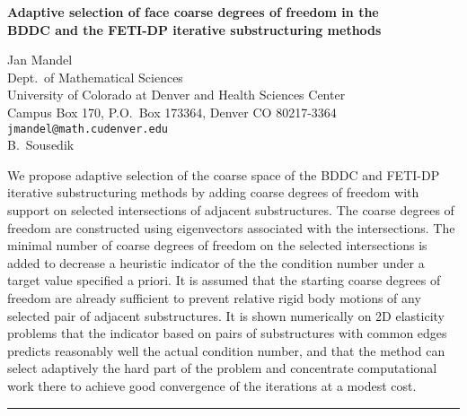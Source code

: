 \documentclass[twosided]{report}
\begin{document}
\begin{center}
{\large			%
{\bf Adaptive selection of face coarse degrees of freedom in the \\
	BDDC and the FETI-DP iterative substructuring methods}}

	Jan Mandel \\
	Dept.~of Mathematical Sciences \\
	University of Colorado at Denver and Health Sciences Center \\
	Campus Box 170, P.O.~Box 173364, Denver CO 80217-3364 \\
	{\tt jmandel@math.cudenver.edu} \\
	B.~Sousedik
\end{center}
We propose adaptive selection of the coarse space of the
BDDC and FETI-DP iterative substructuring methods by adding
coarse degrees of freedom with support on selected
intersections of adjacent substructures. The coarse degrees
of freedom are constructed using eigenvectors associated
with the intersections. The minimal number of coarse degrees
of freedom on the selected intersections is added to
decrease a heuristic indicator of the the condition number
under a target value specified a priori. It is assumed that
the starting coarse degrees of freedom are already
sufficient to prevent relative rigid body motions of any
selected pair of adjacent substructures. It is shown
numerically on 2D elasticity problems that the indicator
based on pairs of substructures with common edges predicts
reasonably well the actual condition number, and that the
method can select adaptively the hard part of the problem
and concentrate computational work there to achieve good
convergence of the iterations at a modest cost.



	\begin{center} \rule{6in}{1pt} \end{center}
\end{document}
